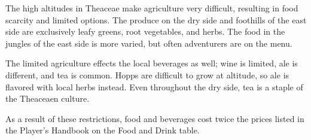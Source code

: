 The high altitudes in Theaceae make agriculture very difficult, resulting in food scarcity and limited options.
The produce on the dry side and foothills of the east side are exclusively leafy greens, root vegetables, and herbs.
The food in the jungles of the east side is more varied, but often adventurers are on the menu.

The limited agriculture effects the local beverages as well; wine is limited, ale is different, and tea is common.
Hopps are difficult to grow at altitude, so ale is flavored with local herbs instead.
Even throughout the dry side, tea is a staple of the Theaceaen culture.

As a result of these restrictions, food and beverages cost twice the prices listed in the Player's Handbook on the Food and Drink table.
